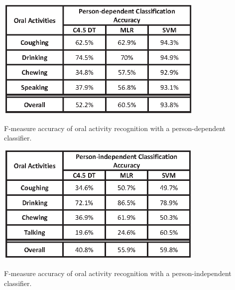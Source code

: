 \begin{table}[!ht]
\centering
\includegraphics[width=10cm]{image/teeth_table2}
\caption{F-measure accuracy of oral activity recognition with a person-dependent classifier.}
\label{teeth_pdc}
\end{table}

\begin{table}[!ht]
\centering
\includegraphics[width=10cm]{image/teeth_table3}
\caption{F-measure accuracy of oral activity recognition with a person-independent classifier.}
\label{teeth_pidc}
\end{table}

